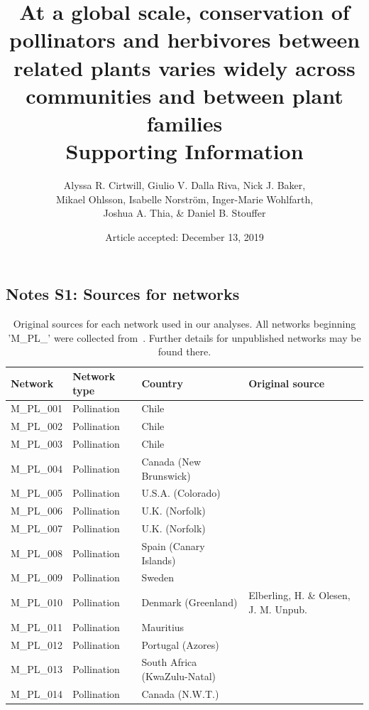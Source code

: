 \documentclass[12pt]{article}
\title{At a global scale, conservation of pollinators and herbivores between related plants varies widely across communities and between plant families\\ Supporting Information}
\author{Alyssa R. Cirtwill, Giulio V. Dalla Riva, Nick J. Baker,\\
Mikael Ohlsson, Isabelle Norstr\"{o}m, Inger-Marie Wohlfarth,\\
Joshua A. Thia, \& Daniel B. Stouffer}
\date{Article accepted: December 13, 2019}
\newcommand{\beginsupplement}{%
        \setcounter{table}{0}
        \renewcommand{\thetable}{S\arabic{table}}%
        \setcounter{figure}{0}
        \renewcommand{\thefigure}{S\arabic{figure}}%
     }
\begin{document}
\maketitle
\baselineskip=8.5mm
\begin{spacing}{1.5}

\beginsupplement
\clearpage

\section*{Notes S1: Sources for networks}
  \begin{table}[!h]
    \caption{Original sources for each network used in our analyses. All networks beginning 'M\_PL\_' were collected from~\citet{weboflife}. Further details for unpublished networks may be found there.}
    \label{sources}
    \begin{center}
    \begin{tabular}{|l l l m{7cm} |}
    \hline
    Network & Network type & Country & Original source  \\
    \hline
    M\_PL\_001  & Pollination & Chile & \citet{Arroyo1982}  \\
    M\_PL\_002  & Pollination & Chile & \citet{Arroyo1982}  \\
    M\_PL\_003  & Pollination & Chile & \citet{Arroyo1982}  \\
    M\_PL\_004  & Pollination & Canada (New Brunswick) & \citet{Barrett1987} \\
    M\_PL\_005  & Pollination & U.S.A. (Colorado) & \citet{Clements1923}  \\
    M\_PL\_006  & Pollination & U.K. (Norfolk) & \citet{Dicks2002} \\
    M\_PL\_007  & Pollination & U.K. (Norfolk) & \citet{Dicks2002} \\
    M\_PL\_008  & Pollination & Spain (Canary Islands) & \citet{Dupont2003}  \\
    M\_PL\_009  & Pollination & Sweden & \citet{Elberling1999} \\
    M\_PL\_010  & Pollination & Denmark (Greenland) & Elberling, H. \& Olesen, J. M. Unpub. \\
    M\_PL\_011  & Pollination & Mauritius & \citet{Olesen2002a}  \\
    M\_PL\_012  & Pollination & Portugal (Azores) & \citet{Olesen2002a}  \\
    M\_PL\_013  & Pollination & South Africa (KwaZulu-Natal) & \citet{Ollerton2003}  \\
    M\_PL\_014  & Pollination & Canada (N.W.T.) & \citet{Hocking1968} \\

\end{tabular}
\end{center}
\end{table}
\end{spacing}
\end{document}
